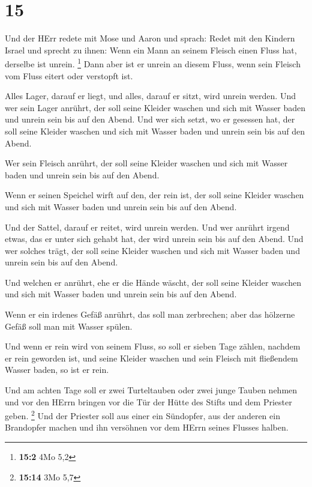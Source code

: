 \hypertarget{section-14}{%
\section{15}\label{section-14}}

 Und der HErr redete mit Mose und Aaron und sprach:
 Redet mit den Kindern Israel und sprecht zu ihnen: Wenn
ein Mann an seinem Fleisch einen Fluss hat, derselbe ist unrein.
\footnote{\textbf{15:2} 4Mo 5,2}  Dann aber ist er unrein
an diesem Fluss, wenn sein Fleisch vom Fluss eitert oder verstopft ist.

 Alles Lager, darauf er liegt, und alles, darauf er sitzt,
wird unrein werden.  Und wer sein Lager anrührt, der soll
seine Kleider waschen und sich mit Wasser baden und unrein sein bis auf
den Abend.  Und wer sich setzt, wo er gesessen hat, der
soll seine Kleider waschen und sich mit Wasser baden und unrein sein bis
auf den Abend.

 Wer sein Fleisch anrührt, der soll seine Kleider waschen
und sich mit Wasser baden und unrein sein bis auf den Abend.

 Wenn er seinen Speichel wirft auf den, der rein ist, der
soll seine Kleider waschen und sich mit Wasser baden und unrein sein bis
auf den Abend.

 Und der Sattel, darauf er reitet, wird unrein werden.
 Und wer anrührt irgend etwas, das er unter sich gehabt
hat, der wird unrein sein bis auf den Abend. Und wer solches trägt, der
soll seine Kleider waschen und sich mit Wasser baden und unrein sein bis
auf den Abend.

 Und welchen er anrührt, ehe er die Hände wäscht, der
soll seine Kleider waschen und sich mit Wasser baden und unrein sein bis
auf den Abend.

 Wenn er ein irdenes Gefäß anrührt, das soll man
zerbrechen; aber das hölzerne Gefäß soll man mit Wasser spülen.

 Und wenn er rein wird von seinem Fluss, so soll er
sieben Tage zählen, nachdem er rein geworden ist, und seine Kleider
waschen und sein Fleisch mit fließendem Wasser baden, so ist er rein.

 Und am achten Tage soll er zwei Turteltauben oder zwei
junge Tauben nehmen und vor den HErrn bringen vor die Tür der Hütte des
Stifts und dem Priester geben. \footnote{\textbf{15:14} 3Mo 5,7}
 Und der Priester soll aus einer ein Sündopfer, aus der
anderen ein Brandopfer machen und ihn versöhnen vor dem HErrn seines
Flusses halben.

